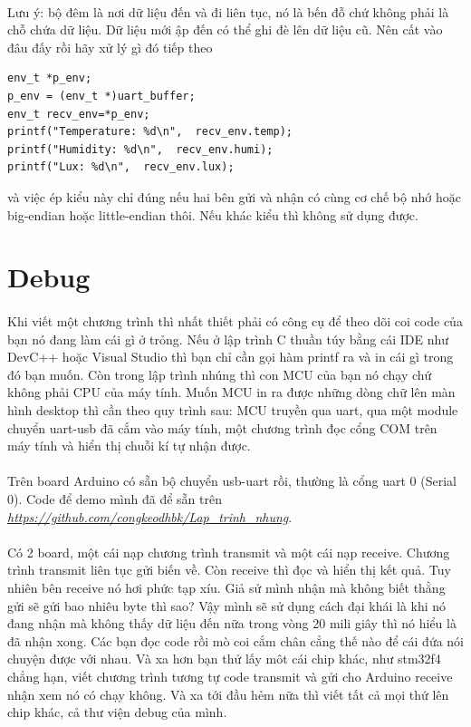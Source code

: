 \documentclass[12pt,a5paper]{book}
\begin{document}
\paragraph{}
Lưu ý: bộ đêm là nơi dữ liệu đến và đi liên tục, nó là bến đỗ chứ không phải là chỗ chứa dữ liệu. Dữ liệu mới ập đến có thể ghi đè lên dữ liệu cũ. Nên cất vào đâu đấy rồi hãy xử lý gì đó tiếp theo
\begin{lstlisting}
env_t *p_env;
p_env = (env_t *)uart_buffer;
env_t recv_env=*p_env;
printf("Temperature: %d\n",  recv_env.temp);
printf("Humidity: %d\n",  recv_env.humi);
printf("Lux: %d\n",  recv_env.lux);
\end{lstlisting}
và việc ép kiểu này chỉ đúng nếu hai bên gửi và nhận có cùng cơ chế bộ nhớ hoặc big-endian hoặc little-endian thôi. Nếu khác kiểu thì không sử dụng được.
\section{Debug}
\paragraph{}
Khi viết một chương trình thì nhất thiết phải có công cụ để theo dõi coi code của bạn nó đang làm cái gì ở trỏng. Nếu ở lập trình C thuần túy bằng cái IDE như DevC++ hoặc Visual Studio thì bạn chỉ cần gọi hàm printf ra và in cái gì trong đó bạn muốn. Còn trong lập trình nhúng thì con MCU của bạn nó chạy chứ không phải CPU của máy tính. Muốn MCU in ra được những dòng chữ lên màn hình desktop thì cần theo quy trình sau: MCU truyền qua uart, qua một module chuyển uart-usb đã cắm vào máy tính, một chương trình đọc cổng COM trên máy tính và hiển thị chuỗi kí tự nhận được.
\paragraph{}
Trên board Arduino có sẵn bộ chuyển usb-uart rồi, thường là cổng uart 0 (Serial 0). Code để demo mình đã để sẵn trên \textit{\url{https://github.com/congkeodhbk/Lap_trinh_nhung}}. 
\paragraph{}
Có 2 board, một cái nạp chương trình transmit và một cái nạp receive. Chương trình transmit liên tục gửi biến về. Còn receive thì đọc và hiển thị kết quả. Tuy nhiên bên receive nó hơi phức tạp xíu. Giả sử mình nhận mà không biết thằng gửi sẽ gửi bao nhiêu byte thì sao? Vậy mình sẽ sử dụng cách đại khái là khi nó đang nhận mà không thấy dữ liệu đến nữa trong vòng 20 mili giây thì nó hiểu là đã nhận xong. Các bạn đọc code rồi mò coi cắm chân cẳng thế nào để cái đứa nói chuyện được với nhau. Và xa hơn bạn thử lấy môt cái chip khác, như stm32f4 chẳng hạn, viết chương trình tương tự code transmit và gửi cho Arduino receive nhận xem nó có chạy không. Và xa tới đầu hẻm nữa thì viết tất cả mọi thứ lên chip khác, cả thư viện debug của mình.
\end{document}
